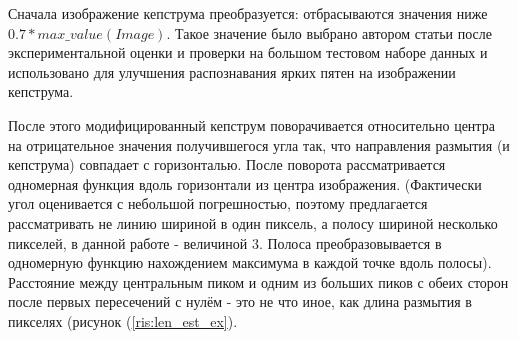 Сначала изображение кепструма преобразуется: отбрасываются значения ниже $0.7 * max\_value(Image)$. Такое значение было выбрано автором статьи после экспериментальной оценки и проверки на большом тестовом наборе данных и использовано для улучшения распознавания ярких пятен на изображении кепструма.

После этого модифицированный кепструм поворачивается относительно центра на отрицательное значения получившегося угла так, что направления размытия (и кепструма) совпадает с горизонталью. После поворота рассматривается одномерная функция вдоль горизонтали из центра изображения. (Фактически угол оценивается с небольшой погрешностью, поэтому предлагается рассматривать не линию шириной в один пиксель, а полосу шириной несколько пикселей, в данной работе - величиной 3. Полоса преобразовывается в одномерную функцию нахождением максимума в каждой точке вдоль полосы). Расстояние между центральным пиком и одним из больших пиков с обеих сторон после первых пересечений с нулём  - это не что иное, как длина размытия в пикселях (рисунок (\ref{ris:len_est_ex}).

